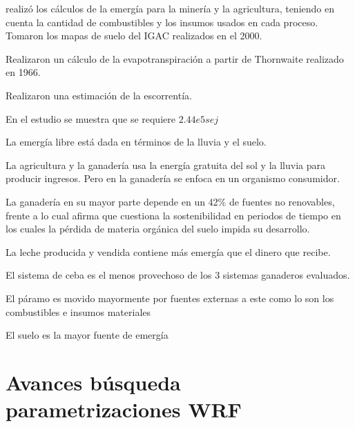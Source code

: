 \documentclass[11pt]{article}
\begin{document}
\citep{Castro-Romero2014} realizó los cálculos de la emergía para la minería y la agricultura, teniendo en cuenta la cantidad de combustibles y los insumos usados en cada proceso. Tomaron los mapas de suelo del IGAC realizados en el 2000.

Realizaron un cálculo de la evapotranspiración a partir de Thornwaite realizado en 1966.

Realizaron una estimación de la escorrentía. 

En el estudio se muestra que se requiere $2.44e5 sej$

La emergía libre está dada en términos de la lluvia y el suelo.

La agricultura y la ganadería usa la energía gratuita del sol y la lluvia para producir ingresos. Pero en la ganadería se enfoca en un organismo consumidor.

La ganadería en su mayor parte depende en un 42\% de fuentes no renovables, frente a lo cual \citet{Castro-Romero2014} afirma que cuestiona la sostenibilidad en periodos de tiempo en los cuales la pérdida de materia orgánica del suelo impida su desarrollo.

La leche producida y vendida contiene más emergía que el dinero que recibe.

El sistema de ceba es el menos provechoso de los 3 sistemas ganaderos evaluados.

El páramo es movido mayormente por fuentes externas a este como lo son los combustibles e insumos materiales

El suelo es la mayor fuente de emergía












\section{Avances búsqueda parametrizaciones WRF}
\end{document}
